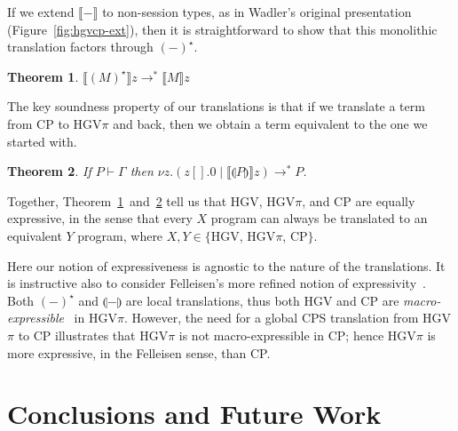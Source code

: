 \documentclass{easychair}
\makeatletter
\newtheorem{theorem}{Theorem}
\newcommand{\ba}{\begin{array}}
\newcommand{\ea}{\end{array}}
\newenvironment{equations}{\[\ba{@{}r@{~}c@{~}l@{}}}{\ea\]}
\newcommand{\cptogv}[1]{\llparenthesis{#1}\rrparenthesis}
\newcommand{\cpj}[2]{{#1} \vdash {#2}}
\newcommand{\gvj}[3]{{#1} \vdash {#2} : {#3}}
\newcommand{\G}{\Gamma}
\newcommand{\cpCut}[3]{\nu {#1}.({#2} \mid {#3})}
\newcommand{\cpEmptyOut}[1]{{#1}[].0}
\newcommand{\cpDual}[1]{{#1}^\bot}
\newcommand{\hgv}{HGV\xspace}
\newcommand{\hgvpi}{HGV$\pi$\xspace}
\newcommand{\lampi}[1]{({#1})^\star}
\newcommand{\hgvcp}[1]{\llbracket{#1}\rrbracket}
\newcommand{\redto}{\longrightarrow}
\makeatother
\begin{document}
If we extend $\hgvcp{-}$ to non-session types, as in Wadler's original presentation
(Figure~\ref{fig:hgvcp-ext}), then it is straightforward to show that this monolithic translation
factors through $\lampi{-}$.
\begin{theorem}
\label{th:factor}
$\hgvcp{\lampi{M}}z \redto^* \hgvcp{M}z$
\end{theorem}
\noindent
The key soundness property of our translations is that if we translate a term from CP to \hgvpi and
back, then we obtain a term equivalent to the one we started with.
\begin{theorem}
\label{th:soundness}
If $\cpj{P}{\G}$ then $\cpCut{z}{\cpEmptyOut{z}}{\hgvcp{\cptogv{P}}z} \redto^* P$.
\end{theorem}
\noindent
Together, Theorem~\ref{th:factor}~and~\ref{th:soundness} tell us that \hgv, \hgvpi, and CP are
equally expressive, in the sense that every $X$ program can always be translated to an equivalent
$Y$ program, where $X,Y \in \{$\hgv, \hgvpi, CP$\}$.

Here our notion of expressiveness is agnostic to the nature of the translations. It is instructive
also to consider Felleisen's more refined notion of expressivity~\cite{Felleisen91}. Both
$\lampi{-}$ and $\cptogv{-}$ are local translations, thus both \hgv and CP are
\emph{macro-expressible}~\cite{Felleisen91} in \hgvpi. However, the need for a global CPS
translation from \hgvpi to CP illustrates that \hgvpi is not macro-expressible in CP; hence \hgvpi
is more expressive, in the Felleisen sense, than CP.
%








\section{Conclusions and Future Work}
\label{sect:conclusion}
\end{document}
